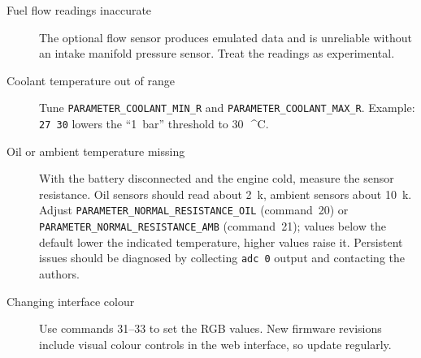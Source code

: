 \begin{description}
    \item[Fuel flow readings inaccurate] The optional flow sensor produces emulated data and is unreliable without an intake manifold pressure sensor. Treat the readings as experimental.
    \item[Coolant temperature out of range] Tune \texttt{PARAMETER\_COOLANT\_MIN\_R} and \texttt{PARAMETER\_COOLANT\_MAX\_R}. Example: \verb|27 30| lowers the ``1~bar'' threshold to 30~\,^{\circ}C.
    \item[Oil or ambient temperature missing] With the battery disconnected and the engine cold, measure the sensor resistance. Oil sensors should read about 2~k\ohm{}, ambient sensors about 10~k\ohm{}. Adjust \texttt{PARAMETER\_NORMAL\_RESISTANCE\_OIL} (command~20) or \texttt{PARAMETER\_NORMAL\_RESISTANCE\_AMB} (command~21); values below the default lower the indicated temperature, higher values raise it. Persistent issues should be diagnosed by collecting \verb|adc 0| output and contacting the authors.
    \item[Changing interface colour] Use commands 31--33 to set the RGB values. New firmware revisions include visual colour controls in the web interface, so update regularly.
\end{description}
